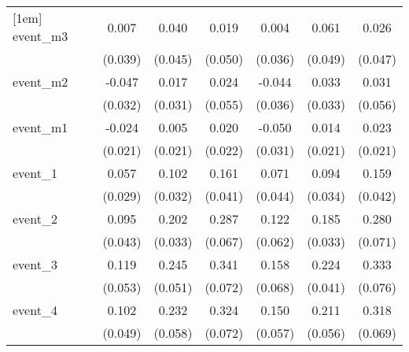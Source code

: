 {\begin{tabular}{l*{6}{c}}
[1em]
event\_m3    &       0.007         &       0.040         &       0.019         &       0.004         &       0.061         &       0.026         \\
            &     (0.039)         &     (0.045)         &     (0.050)         &     (0.036)         &     (0.049)         &     (0.047)         \\
[1em]
event\_m2    &      -0.047         &       0.017         &       0.024         &      -0.044         &       0.033         &       0.031         \\
            &     (0.032)         &     (0.031)         &     (0.055)         &     (0.036)         &     (0.033)         &     (0.056)         \\
[1em]
event\_m1    &      -0.024         &       0.005         &       0.020         &      -0.050         &       0.014         &       0.023         \\
            &     (0.021)         &     (0.021)         &     (0.022)         &     (0.031)         &     (0.021)         &     (0.021)         \\
[1em]
event\_1     &       0.057\sym{*}  &       0.102\sym{**} &       0.161\sym{***}&       0.071         &       0.094\sym{**} &       0.159\sym{***}\\
            &     (0.029)         &     (0.032)         &     (0.041)         &     (0.044)         &     (0.034)         &     (0.042)         \\
[1em]
event\_2     &       0.095\sym{*}  &       0.202\sym{***}&       0.287\sym{***}&       0.122\sym{*}  &       0.185\sym{***}&       0.280\sym{***}\\
            &     (0.043)         &     (0.033)         &     (0.067)         &     (0.062)         &     (0.033)         &     (0.071)         \\
[1em]
event\_3     &       0.119\sym{*}  &       0.245\sym{***}&       0.341\sym{***}&       0.158\sym{*}  &       0.224\sym{***}&       0.333\sym{***}\\
            &     (0.053)         &     (0.051)         &     (0.072)         &     (0.068)         &     (0.041)         &     (0.076)         \\
[1em]
event\_4     &       0.102\sym{*}  &       0.232\sym{***}&       0.324\sym{***}&       0.150\sym{**} &       0.211\sym{***}&       0.318\sym{***}\\
            &     (0.049)         &     (0.058)         &     (0.072)         &     (0.057)         &     (0.056)         &     (0.069)         \\

\end{tabular}}
